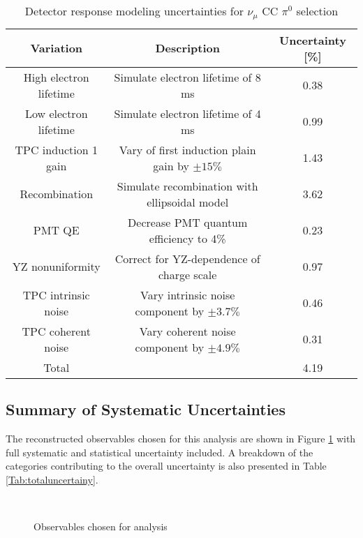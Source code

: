 \documentclass[../main.tex]{subfiles}
\begin{document}
\begin{table}[H]
    \caption{Detector response modeling uncertainties for $\nu_{\mu}$ CC $\pi^{0}$ selection}
    \vspace{0.1cm}
    \centering
    \begin{tabular}{ c c c } 
    \hline
    Variation & Description & Uncertainty [\%] \\
    \hline
    High electron lifetime & Simulate electron lifetime of 8 ms & 0.38 \\
    Low electron lifetime & Simulate electron lifetime of 4 ms & 0.99 \\
    TPC induction 1 gain & Vary of first induction plain gain by $\pm 15 \%$  & 1.43 \\
    Recombination & Simulate recombination with ellipsoidal model & 3.62 \\
    PMT QE & Decrease PMT quantum efficiency to 4\% & 0.23 \\
    YZ nonuniformity & Correct for YZ-dependence of charge scale & 0.97 \\
    TPC intrinsic noise & Vary intrinsic noise component by $\pm 3.7\%$ & 0.46 \\
    TPC coherent noise & Vary coherent noise component by $\pm 4.9\%$ & 0.31 \\
    \hline
    Total & & 4.19 \\
    \hline
    \end{tabular}
    \label{Tab:detparameters}
\end{table}

\subsection{Summary of Systematic Uncertainties}
The reconstructed observables chosen for this analysis are shown in Figure \ref{fig:reco_observables_syst} with full systematic and statistical uncertainty included.  A breakdown of the categories contributing to the overall uncertainty is also presented in Table \ref{Tab:totaluncertainy}.

\begin{figure}[H]
    \center
     \\
    \caption{Observables chosen for analysis}
    \label{fig:reco_observables_syst}
\end{figure}
\end{document}
